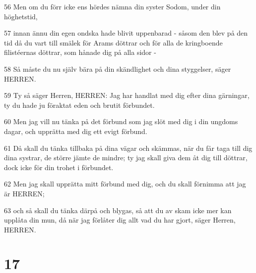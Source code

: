 \par 56 Men om du förr icke ens hördes nämna din syster Sodom, under din höghetstid,
\par 57 innan ännu din egen ondska hade blivit uppenbarad - såsom den blev på den tid då du vart till smälek för Arams döttrar och för alla de kringboende filistéernas döttrar, som hånade dig på alla sidor -
\par 58 Så måste du nu själv bära på din skändlighet och dina styggelser, säger HERREN.
\par 59 Ty så säger Herren, HERREN: Jag har handlat med dig efter dina gärningar, ty du hade ju föraktat eden och brutit förbundet.
\par 60 Men jag vill nu tänka på det förbund som jag slöt med dig i din ungdoms dagar, och upprätta med dig ett evigt förbund.
\par 61 Då skall du tänka tillbaka på dina vägar och skämmas, när du får taga till dig dina systrar, de större jämte de mindre; ty jag skall giva dem åt dig till döttrar, dock icke för din trohet i förbundet.
\par 62 Men jag skall upprätta mitt förbund med dig, och du skall förnimma att jag är HERREN;
\par 63 och så skall du tänka därpå och blygas, så att du av skam icke mer kan upplåta din mun, då när jag förlåter dig allt vad du har gjort, säger Herren, HERREN.

\chapter{17}

